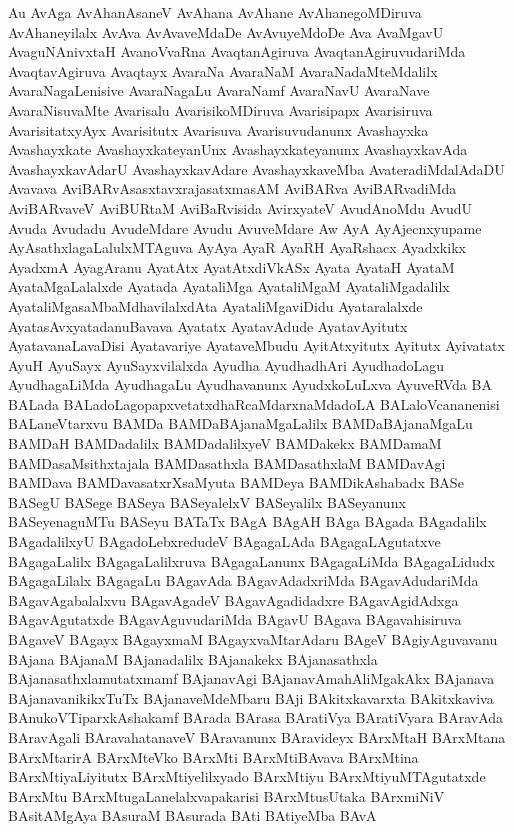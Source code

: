{Au
AvAga
AvAhanAsaneV
AvAhana
AvAhane
AvAhanegoMDiruva
AvAhaneyilalx
AvAva
AvAvaveMdaDe
AvAvuyeMdoDe
Ava
AvaMgavU
AvaguNAnivxtaH
AvanoVvaRna
AvaqtanAgiruva
AvaqtanAgiruvudariMda
AvaqtavAgiruva
Avaqtayx
AvaraNa
AvaraNaM
AvaraNadaMteMdalilx
AvaraNagaLenisive
AvaraNagaLu
AvaraNamf
AvaraNavU
AvaraNave
AvaraNisuvaMte
Avarisalu
AvarisikoMDiruva
Avarisipapx
Avarisiruva
AvarisitatxyAyx
Avarisitutx
Avarisuva
Avarisuvudanunx
Avashayxka
Avashayxkate
AvashayxkateyanUnx
Avashayxkateyanunx
AvashayxkavAda
AvashayxkavAdarU
AvashayxkavAdare
AvashayxkaveMba
AvateradiMdalAdaDU
Avavava
AviBARvAsasxtavxrajasatxmasAM
AviBARva
AviBARvadiMda
AviBARvaveV
AviBURtaM
AviBaRvisida
AvirxyateV
AvudAnoMdu
AvudU
Avuda
Avudadu
AvudeMdare
Avudu
AvuveMdare
Aw
AyA
AyAjecnxyupame
AyAsathxlagaLalulxMTAguva
AyAya
AyaR
AyaRH
AyaRshacx
Ayadxkikx
AyadxmA
AyagAranu
AyatAtx
AyatAtxdiVkASx
Ayata
AyataH
AyataM
AyataMgaLalalxde
Ayatada
AyataliMga
AyataliMgaM
AyataliMgadalilx
AyataliMgasaMbaMdhavilalxdAta
AyataliMgaviDidu
Ayataralalxde
AyatasAvxyatadanuBavava
Ayatatx
AyatavAdude
AyatavAyitutx
AyatavanaLavaDisi
Ayatavariye
AyataveMbudu
AyitAtxyitutx
Ayitutx
Ayivatatx
AyuH
AyuSayx
AyuSayxvilalxda
Ayudha
AyudhadhAri
AyudhadoLagu
AyudhagaLiMda
AyudhagaLu
Ayudhavanunx
AyudxkoLuLxva
AyuveRVda
BA
BALada
BALadoLagopapxvetatxdhaRcaMdarxnaMdadoLA
BALaloVcananenisi
BALaneVtarxvu
BAMDa
BAMDaBAjanaMgaLalilx
BAMDaBAjanaMgaLu
BAMDaH
BAMDadalilx
BAMDadalilxyeV
BAMDakekx
BAMDamaM
BAMDasaMsithxtajala
BAMDasathxla
BAMDasathxlaM
BAMDavAgi
BAMDava
BAMDavasatxrXsaMyuta
BAMDeya
BAMDikAshabadx
BASe
BASegU
BASege
BASeya
BASeyalelxV
BASeyalilx
BASeyanunx
BASeyenaguMTu
BASeyu
BATaTx
BAgA
BAgAH
BAga
BAgada
BAgadalilx
BAgadalilxyU
BAgadoLebxredudeV
BAgagaLAda
BAgagaLAgutatxve
BAgagaLalilx
BAgagaLalilxruva
BAgagaLanunx
BAgagaLiMda
BAgagaLidudx
BAgagaLilalx
BAgagaLu
BAgavAda
BAgavAdadxriMda
BAgavAdudariMda
BAgavAgabalalxvu
BAgavAgadeV
BAgavAgadidadxre
BAgavAgidAdxga
BAgavAgutatxde
BAgavAguvudariMda
BAgavU
BAgava
BAgavahisiruva
BAgaveV
BAgayx
BAgayxmaM
BAgayxvaMtarAdaru
BAgeV
BAgiyAguvavanu
BAjana
BAjanaM
BAjanadalilx
BAjanakekx
BAjanasathxla
BAjanasathxlamutatxmamf
BAjanavAgi
BAjanavAmahAliMgakAkx
BAjanava
BAjanavanikikxTuTx
BAjanaveMdeMbaru
BAji
BAkitxkavarxta
BAkitxkaviva
BAnukoVTiparxkAshakamf
BArada
BArasa
BAratiVya
BAratiVyara
BAravAda
BAravAgali
BAravahatanaveV
BAravanunx
BAravideyx
BArxMtaH
BArxMtana
BArxMtarirA
BArxMteVko
BArxMti
BArxMtiBAvava
BArxMtina
BArxMtiyaLiyitutx
BArxMtiyelilxyado
BArxMtiyu
BArxMtiyuMTAgutatxde
BArxMtu
BArxMtugaLanelalxvapakarisi
BArxMtusUtaka
BArxmiNiV
BAsitAMgAya
BAsuraM
BAsurada
BAti
BAtiyeMba
BAvA
}
